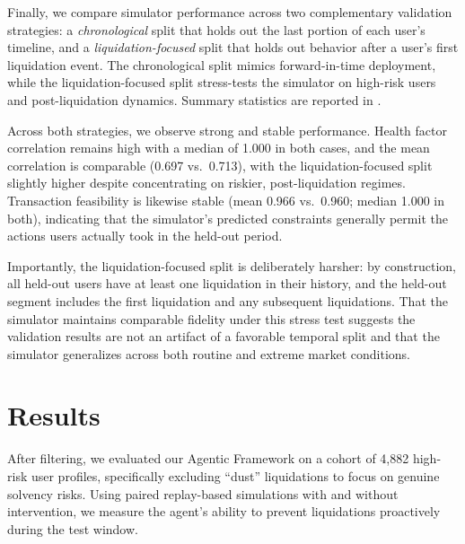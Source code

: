 \documentclass[manuscript,screen,review]{acmart}
\begin{document}
Finally, we compare simulator performance across two complementary validation strategies: a \emph{chronological} split that holds out the last portion of each user’s timeline, and a \emph{liquidation-focused} split that holds out behavior after a user’s first liquidation event. The chronological split mimics forward-in-time deployment, while the liquidation-focused split stress-tests the simulator on high-risk users and post-liquidation dynamics. Summary statistics are reported in .

Across both strategies, we observe strong and stable performance. Health factor correlation remains high with a median of 1.000 in both cases, and the mean correlation is comparable (0.697 vs.\ 0.713), with the liquidation-focused split slightly higher despite concentrating on riskier, post-liquidation regimes. Transaction feasibility is likewise stable (mean 0.966 vs.\ 0.960; median 1.000 in both), indicating that the simulator’s predicted constraints generally permit the actions users actually took in the held-out period.

Importantly, the liquidation-focused split is deliberately harsher: by construction, all held-out users have at least one liquidation in their history, and the held-out segment includes the first liquidation and any subsequent liquidations. That the simulator maintains comparable fidelity under this stress test suggests the validation results are not an artifact of a favorable temporal split and that the simulator generalizes across both routine and extreme market conditions.

\section{Results}
\vspace{-1mm}

After filtering, we evaluated our Agentic Framework on a cohort of 4,882 high-risk user profiles, specifically excluding ``dust'' liquidations to focus on genuine solvency risks. 
Using paired replay-based simulations with and without intervention, we measure the agent's ability to prevent liquidations proactively during the test window.

\end{document}

